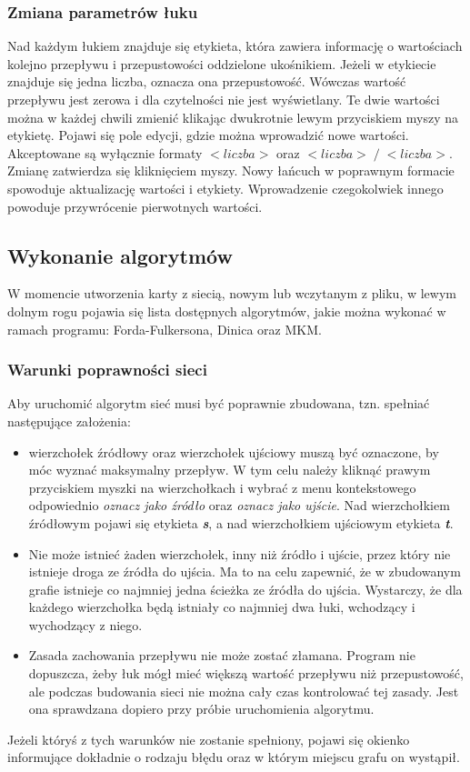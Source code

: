 \subsubsection{Zmiana parametrów łuku}
Nad każdym łukiem znajduje się etykieta, która zawiera informację o wartościach kolejno przepływu i przepustowości oddzielone ukośnikiem. Jeżeli w etykiecie znajduje się jedna liczba, oznacza ona przepustowość. Wówczas wartość przepływu jest zerowa i dla czytelności nie jest wyświetlany. Te dwie wartości można w każdej chwili zmienić klikając dwukrotnie lewym przyciskiem myszy na etykietę. Pojawi się pole edycji, gdzie można wprowadzić nowe wartości. Akceptowane są wyłącznie formaty $ <liczba> $ oraz $ <liczba>\;/\;<liczba> $. Zmianę zatwierdza się kliknięciem myszy. Nowy łańcuch w poprawnym formacie spowoduje aktualizację wartości i etykiety. Wprowadzenie czegokolwiek innego powoduje przywrócenie pierwotnych wartości.
\subsection{Wykonanie algorytmów}
W momencie utworzenia karty z siecią, nowym lub wczytanym z pliku, w lewym dolnym rogu pojawia się lista dostępnych algorytmów, jakie można wykonać w ramach programu: Forda-Fulkersona, Dinica oraz MKM.
\subsubsection{Warunki poprawności sieci}
Aby uruchomić algorytm sieć musi być poprawnie zbudowana, tzn. spełniać następujące założenia:
\begin{itemize}
	\item wierzchołek źródłowy oraz wierzchołek ujściowy muszą być oznaczone, by móc wyznać maksymalny przepływ. W tym celu należy kliknąć prawym przyciskiem myszki na wierzchołkach i wybrać z menu kontekstowego odpowiednio \textit{oznacz jako źródło} oraz \textit{oznacz jako ujście}. Nad wierzchołkiem źródłowym pojawi się etykieta \textit{\textbf{s}}, a nad wierzchołkiem ujściowym etykieta \textit{\textbf{t}}.
	\item Nie może istnieć żaden wierzchołek, inny niż źródło i ujście, przez który nie istnieje droga ze źródła do ujścia. Ma to na celu zapewnić, że w zbudowanym grafie istnieje co najmniej jedna ścieżka ze źródła do ujścia. Wystarczy, że dla każdego wierzchołka będą istniały co najmniej dwa łuki, wchodzący i wychodzący z niego.
	\item Zasada zachowania przepływu nie może zostać złamana. Program nie dopuszcza, żeby łuk mógł mieć większą wartość przepływu niż przepustowość, ale podczas budowania sieci nie można cały czas kontrolować tej zasady. Jest ona sprawdzana dopiero przy próbie uruchomienia algorytmu.
\end{itemize}
Jeżeli któryś z tych warunków nie zostanie spełniony, pojawi się okienko informujące dokładnie o rodzaju błędu oraz w którym miejscu grafu on wystąpił.

